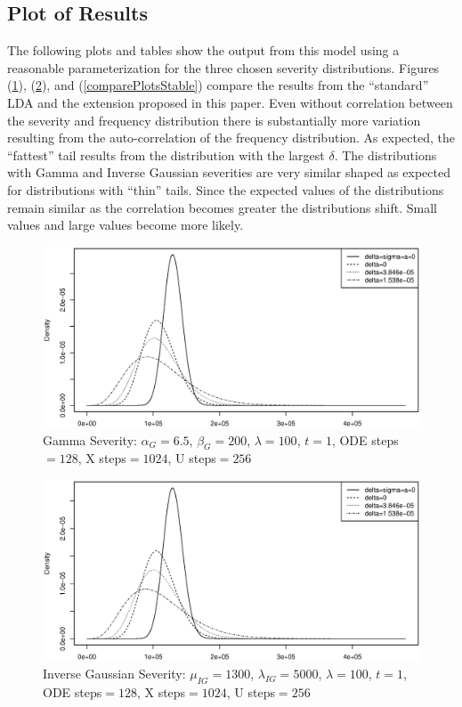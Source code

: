 \documentclass{article}
\theoremstyle{definition}
\newcommand{\adjustHeight}{\setlength{\abovecaptionskip}{-15pt}}
\begin{document}
\subsection{Plot of Results}

The following plots and tables show the output from this model using a reasonable parameterization for the three chosen severity distributions.  Figures (\ref{comparePlotsGamma}), (\ref{comparePlotsIG}), and (\ref{comparePlotsStable}) compare the results from the ``standard'' LDA and the extension proposed in this paper.  Even without correlation between the severity and frequency distribution there is substantially more variation resulting from the auto-correlation of the frequency distribution. As expected, the ``fattest'' tail results from the distribution with the largest \(\delta\). The distributions with Gamma and Inverse Gaussian severities are very similar shaped as expected for distributions with ``thin'' tails. Since the expected values of the distributions remain similar as the correlation becomes greater the distributions shift.  Small values and large values become more likely.   

\begin{figure}[H] 
\adjustHeight

\centering
\includegraphics[width=1\textwidth]{Figure4}
\caption{Gamma Severity: \(\alpha_G=6.5\), \(\beta_G=200\), \(\lambda=100\),  \(t=1\), ODE steps\(=128\), X steps\(=1024\), U steps\(=256\)}\label{comparePlotsGamma}
\end{figure}

\begin{figure}[H] 
\adjustHeight

\centering
\includegraphics[width=1\textwidth]{Figure5}
\caption{Inverse Gaussian Severity: \(\mu_{IG}=1300\), \(\lambda_{IG}=5000\), \(\lambda=100\),  \(t=1\), ODE steps\(=128\), X steps\(=1024\), U steps\(=256\)}\label{comparePlotsIG}
\end{figure}
\end{document}
